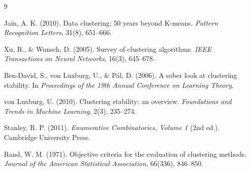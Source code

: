 \documentclass[11pt]{amsart}
\theoremstyle{plain}
\theoremstyle{definition}
\begin{document}
\begin{thebibliography}{9}

Jain, A. K. (2010).
Data clustering: 50 years beyond K-means.
\textit{Pattern Recognition Letters}, 31(8), 651--666.

Xu, R., \& Wunsch, D. (2005).
Survey of clustering algorithms.
\textit{IEEE Transactions on Neural Networks}, 16(3), 645--678.

Ben-David, S., von Luxburg, U., \& P\'al, D. (2006).
A sober look at clustering stability.
In \textit{Proceedings of the 19th Annual Conference on Learning Theory}.

von Luxburg, U. (2010).
Clustering stability: an overview.
\textit{Foundations and Trends in Machine Learning}, 2(3), 235--274.

Stanley, R. P. (2011).
\textit{Enumerative Combinatorics, Volume 1} (2nd ed.).
Cambridge University Press.

Rand, W. M. (1971).
Objective criteria for the evaluation of clustering methods.
\textit{Journal of the American Statistical Association}, 66(336), 846--850.


\end{thebibliography}
\end{document}

